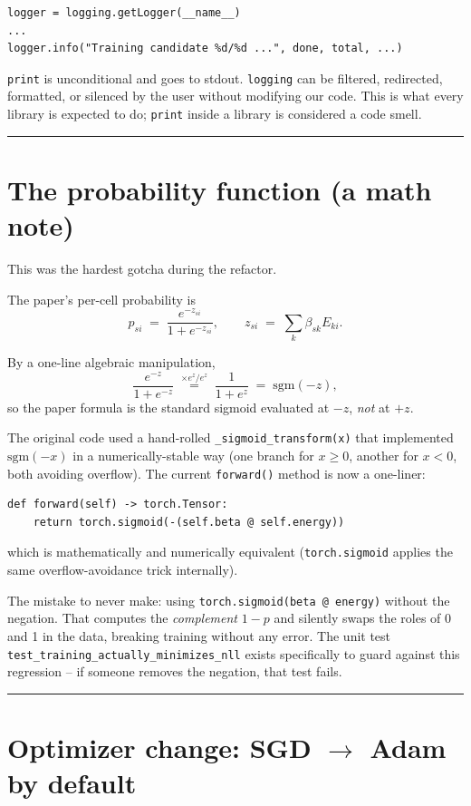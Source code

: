 \documentclass[11pt]{article}
\begin{document}
\begin{lstlisting}
logger = logging.getLogger(__name__)
...
logger.info("Training candidate %d/%d ...", done, total, ...)
\end{lstlisting}

\texttt{print} is unconditional and goes to stdout. \texttt{logging} can be
filtered, redirected, formatted, or silenced by the user without modifying
our code. This is what every library is expected to do; \texttt{print}
inside a library is considered a code smell.

\bigskip
\hrule
\bigskip

\section{The probability function (a math note)}
\label{sec:sigmoid}

This was the hardest gotcha during the refactor.

The paper's per-cell probability is
\[
  p_{si} \;=\; \frac{e^{-z_{si}}}{1 + e^{-z_{si}}}, \qquad z_{si} \;=\; \sum_k \beta_{sk} E_{ki}.
\]

By a one-line algebraic manipulation,
\[
  \frac{e^{-z}}{1 + e^{-z}} \;\stackrel{\times e^z / e^z}{=}\; \frac{1}{1 + e^{z}} \;=\; \mathrm{sgm}(-z),
\]
so the paper formula is the standard sigmoid evaluated at $-z$, \emph{not}
at $+z$.

The original code used a hand-rolled \texttt{\_sigmoid\_transform(x)} that
implemented $\mathrm{sgm}(-x)$ in a numerically-stable way (one branch for
$x \ge 0$, another for $x < 0$, both avoiding overflow). The current
\texttt{forward()} method is now a one-liner:
\begin{lstlisting}
def forward(self) -> torch.Tensor:
    return torch.sigmoid(-(self.beta @ self.energy))
\end{lstlisting}
which is mathematically and numerically equivalent (\texttt{torch.sigmoid}
applies the same overflow-avoidance trick internally).

The mistake to never make: using \texttt{torch.sigmoid(beta @ energy)}
without the negation. That computes the \emph{complement} $1 - p$ and
silently swaps the roles of 0 and 1 in the data, breaking training without
any error. The unit test \texttt{test\_training\_actually\_minimizes\_nll}
exists specifically to guard against this regression -- if someone removes
the negation, that test fails.

\bigskip
\hrule
\bigskip

\section{Optimizer change: SGD $\rightarrow$ Adam by default}
\end{document}
